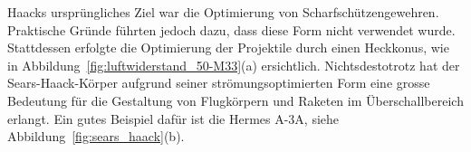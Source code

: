 Haacks ursprüngliches Ziel war die Optimierung von Scharfschützengewehren. 
%
Praktische Gründe führten jedoch dazu, dass diese 
Form nicht verwendet wurde. 
Stattdessen erfolgte die Optimierung der Projektile 
durch einen Heckkonus, wie in Abbildung~\ref{fig:luftwiderstand_50-M33}(a) ersichtlich.
Nichtsdestotrotz hat der Sears-Haack-Körper aufgrund 
seiner strömungsoptimierten Form eine grosse Bedeutung 
für die Gestaltung von Flugkörpern und Raketen
im Überschallbereich erlangt.
Ein gutes Beispiel dafür ist die Hermes A-3A, siehe Abbildung~\ref{fig:sears_haack}(b).
%
